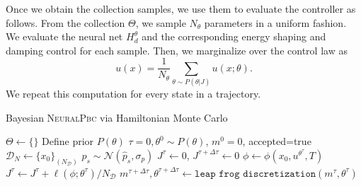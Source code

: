 \begin{enumerate}
    Once we obtain the collection samples, we use them to evaluate the
    controller as follows.
    From the collection $\Theta$, we sample $N_{\theta}$ parameters in a uniform
    fashion.
    We evaluate the neural net $H^\theta_d$ and the corresponding energy shaping
    and damping control for each sample.
    Then, we marginalize over the control law as 
    \begin{equation*}
        u(x) = \frac{1}{N_{\theta}} \sum_{\theta \sim P(\theta | J)} u(x; \theta).
    \end{equation*} 
    We repeat this computation for every state in a trajectory.
    \begin{algorithm}[H]
        \centering
        \caption{Bayesian \textsc{NeuralPbc} via Hamiltonian Monte Carlo}\label{algo:hmc}
        \begin{algorithmic}[1]
        \State $\Theta \leftarrow \{\}$ 
        \State Define prior $P(\theta)$
            \State $\tau=0, \theta^{0} \sim P(\theta)$, $m^0 = 0$, accepted=true
                \State $\mathcal{D}_N \gets \{x_0\}_{(N_{\mathcal{D}})}$             
                \State $p_s \sim \mathcal{N}(\hat{p}_s, \sigma_p)$
                \State $J^\tau \leftarrow 0$,  $J^{\tau + \Delta \tau} \leftarrow 0$
                    \State $\phi \leftarrow \phi(x_0, u^{\theta^{\tau}}, T) $
                    \State $J^\tau  \gets J^\tau  + \ell(\phi; \theta^{\tau})/N_{\mathcal{D}}$ 
                \EndFor
                \State $m^{\tau + \Delta \tau}, \theta ^{\tau + \Delta \tau} \leftarrow \texttt{leap frog discretization}(m^{\tau}, \theta ^{\tau} )$

\end{algorithmic}
\end{algorithm}
\end{enumerate}
